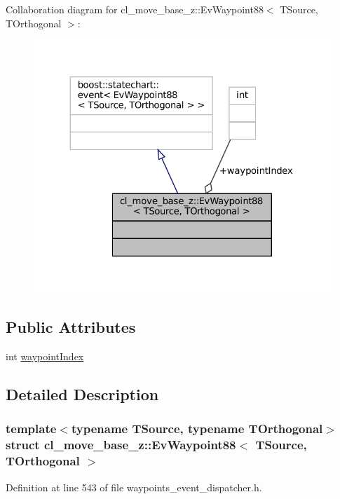 Collaboration diagram for cl\+\_\+move\+\_\+base\+\_\+z\+:\+:Ev\+Waypoint88$<$ T\+Source, T\+Orthogonal $>$\+:
\nopagebreak
\begin{figure}[H]
\begin{center}
\leavevmode
\includegraphics[width=324pt]{structcl__move__base__z_1_1EvWaypoint88__coll__graph}
\end{center}
\end{figure}
\subsection*{Public Attributes}
\begin{DoxyCompactItemize}
\item 
int \hyperlink{structcl__move__base__z_1_1EvWaypoint88_acd3e4a002a90e05e8f258f05b1ea1984}{waypoint\+Index}
\end{DoxyCompactItemize}


\subsection{Detailed Description}
\subsubsection*{template$<$typename T\+Source, typename T\+Orthogonal$>$\newline
struct cl\+\_\+move\+\_\+base\+\_\+z\+::\+Ev\+Waypoint88$<$ T\+Source, T\+Orthogonal $>$}



Definition at line 543 of file waypoints\+\_\+event\+\_\+dispatcher.\+h.



